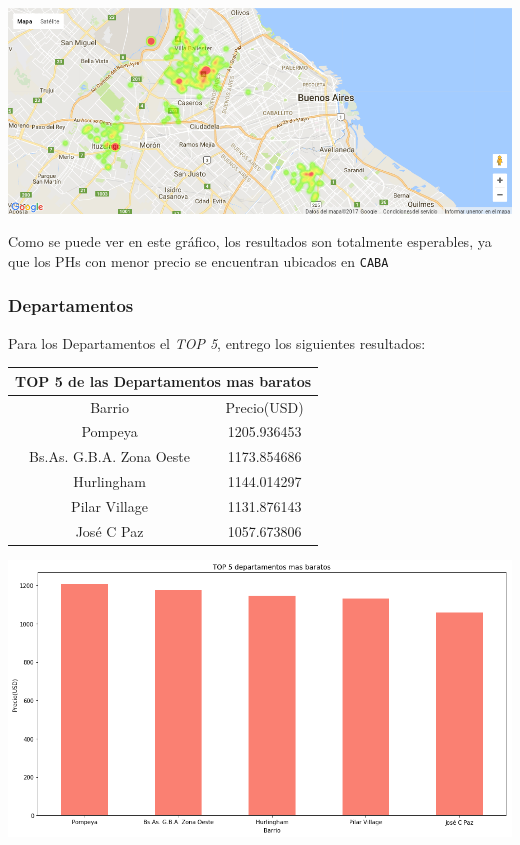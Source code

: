 \documentclass[a4paper, 10pt]{article}
\def\code#1{\texttt{#1}}
\begin{document}
				\begin{center}
   		    				\includegraphics[width=\textwidth]{images/ubicPHb}
				\end{center}	
				
				Como se puede ver en este gráfico, los resultados son totalmente esperables, ya que los PHs con menor precio se encuentran ubicados en \code{CABA}
				
				\subsubsection{Departamentos}
				
					Para los Departamentos el \emph{TOP 5}, entrego los siguientes resultados:
				
					\begin{center}
						\begin{tabular}{ |c|c| }
							\hline
							\multicolumn{2}{|c|}{TOP 5 de las Departamentos mas baratos}\\
							\hline
							\hline
							Barrio & Precio(USD)\\
							\hline
							Pompeya & 1205.936453 \\
							Bs.As. G.B.A. Zona Oeste & 1173.854686 \\
							Hurlingham & 1144.014297 \\
							Pilar Village & 1131.876143 \\
							José C Paz & 1057.673806 \\
						\end{tabular}
					\end{center}
				
				
				\begin{center}
   		    				\includegraphics[width=\textwidth]{images/topDb}
				\end{center}
				
\end{document}
